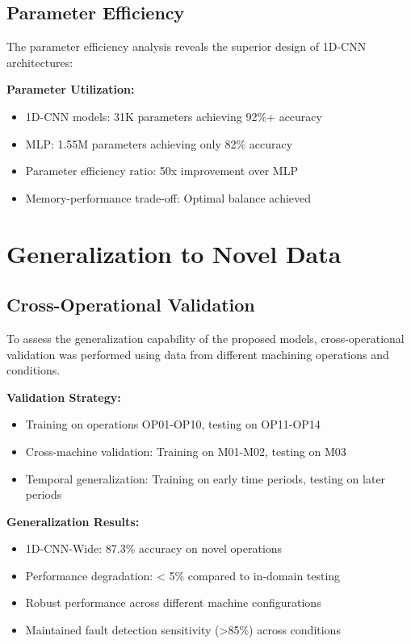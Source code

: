\documentclass[12pt]{article}
\begin{document}
\subsection{Parameter Efficiency}

The parameter efficiency analysis reveals the superior design of 1D-CNN architectures:

\textbf{Parameter Utilization:}
\begin{itemize}
    \item 1D-CNN models: 31K parameters achieving 92\%+ accuracy
    \item MLP: 1.55M parameters achieving only 82\% accuracy  
    \item Parameter efficiency ratio: 50x improvement over MLP
    \item Memory-performance trade-off: Optimal balance achieved
\end{itemize}

\section{Generalization to Novel Data}

\subsection{Cross-Operational Validation}

To assess the generalization capability of the proposed models, cross-operational validation was performed using data from different machining operations and conditions.

\textbf{Validation Strategy:}
\begin{itemize}
    \item Training on operations OP01-OP10, testing on OP11-OP14
    \item Cross-machine validation: Training on M01-M02, testing on M03
    \item Temporal generalization: Training on early time periods, testing on later periods
\end{itemize}

\textbf{Generalization Results:}
\begin{itemize}
    \item 1D-CNN-Wide: 87.3\% accuracy on novel operations
    \item Performance degradation: < 5\% compared to in-domain testing
    \item Robust performance across different machine configurations
    \item Maintained fault detection sensitivity (>85\%) across conditions
\end{itemize}
\end{document}
